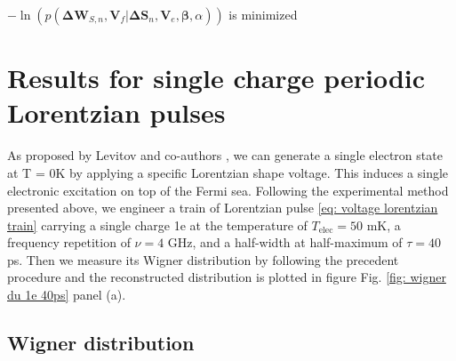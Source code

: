 \begin{algorithm}[H]
\begin{algorithmic}
		
		
		
		\UNTIL $-\ln\left(p\left(\mathbf{\Delta W}_{S,n}, \mathbf{V}_{f} \left|
		\mathbf{\Delta S}_{n},\mathbf{V}_{e}, \mathbf{\beta}, \alpha \right. \right) \right) $
		is minimized
	\end{algorithmic}
\end{algorithm}

\newpage

\section{\texorpdfstring{Results for single charge periodic Lorentzian pulses}{Results for single charge periodic Lorentzian pulses} \label{sec: Results for single charge periodic Lorentzian pulses}}

As proposed by Levitov and co-authors \cite{levitov1996electro}, we can generate a single electron state at T = 0K by applying a specific Lorentzian shape voltage.
This induces a single electronic excitation on top of the Fermi sea.
Following the experimental method presented above, we engineer a train of Lorentzian pulse \eqref{eq: voltage lorentzian train} carrying a single charge 1e at the temperature of $T_{\mathrm{elec}} = 50$ mK, a frequency repetition of $\nu = 4$ GHz, and a half-width at half-maximum of $\tau = 40$ ps.
Then we measure its Wigner distribution by following the precedent procedure and the reconstructed distribution is plotted in figure Fig. \ref{fig: wigner du 1e 40ps} panel (a).

\subsection{Wigner distribution}

